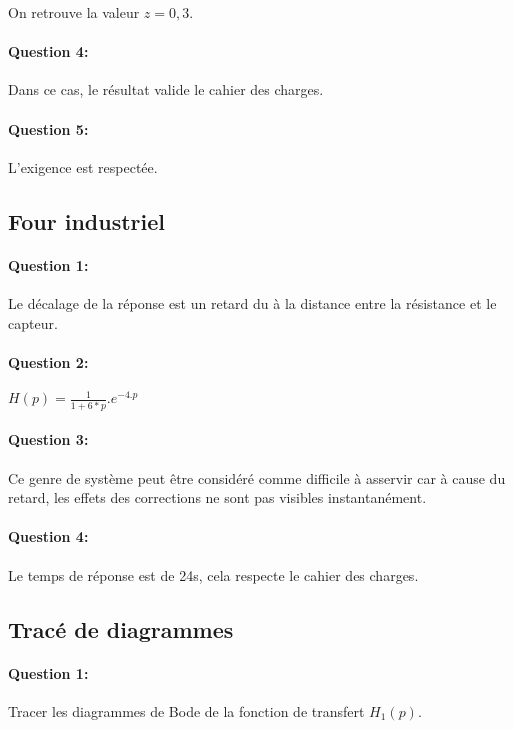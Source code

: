 On retrouve la valeur $z=0,3$.

\paragraph{Question 4:}

Dans ce cas, le résultat valide le cahier des charges.

\paragraph{Question 5:}

L'exigence est respectée.

\subsection{Four industriel}

\paragraph{Question 1:}

Le décalage de la réponse est un retard du à la distance entre la résistance et le capteur.

\paragraph{Question 2:}

$H(p)=\frac{1}{1+6*p}.e^{-4.p}$

\paragraph{Question 3:}

Ce genre de système peut être considéré comme difficile à asservir car à cause du retard, les effets des corrections ne sont pas visibles instantanément.

\paragraph{Question 4:}

Le temps de réponse est de 24s, cela respecte le cahier des charges.

\subsection{Tracé de diagrammes}

\paragraph{Question 1:} Tracer les diagrammes de Bode de la fonction de transfert $H_1(p)$.

